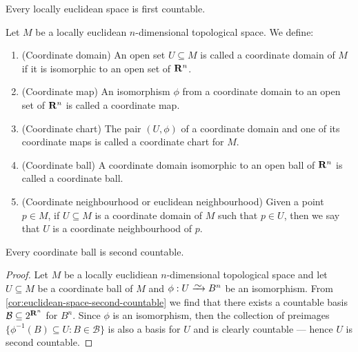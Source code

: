 \begin{proposition}
\label{prop:locally-euclidean-first-countable}
Every locally euclidean space is first countable.
\end{proposition}


\begin{definition}[Miscelaneous]
Let \(M\) be a locally euclidean \(n\)-dimensional topological space. We
define:
\begin{enumerate}[(C1)]
  \item\label{def: coordinate domain}
    (Coordinate domain) An open set \(U \subseteq M\) is called a coordinate
    domain of \(M\) if it is isomorphic to an open set of \(\mathbf{R}^n\).
  \item\label{def: coordinate map}
    (Coordinate map) An isomorphism \(\phi\) from a coordinate domain to an
    open set of \(\mathbf{R}^n\) is called a coordinate map.
  \item\label{def: coordinate chart}
    (Coordinate chart) The pair \((U, \phi)\) of a coordinate domain and one
    of its coordinate maps is called a coordinate chart for \(M\).
  \item\label{def: coordinate ball}
    (Coordinate ball) A coordinate domain isomorphic to an open ball of
    \(\mathbf{R}^n\) is called a coordinate ball.
  \item\label{def: euclidean neighbourhood}
    (Coordinate neighbourhood or euclidean neighbourhood) Given a point \(p
    \in M\), if \(U \subseteq M\) is a coordinate domain of \(M\) such that
    \(p \in U\), then we say that \(U\) is a coordinate neighbourhood of
    \(p\).
\end{enumerate}
\end{definition}

\begin{proposition}
\label{prop:coordinate-ball-second-countable}
Every coordinate ball is second countable.
\end{proposition}

\begin{proof}
Let \(M\) be a locally euclidiean \(n\)-dimensional topological space and let
\(U \subseteq M\) be a coordinate ball of \(M\) and \(\phi: U \isoto B^n\) be an
isomorphism. From \cref{cor:euclidean-space-second-countable} we find that there
exists a countable basis \(\mathcal B \subseteq 2^{\mathbf{R}^n}\) for \(B^n\). Since
\(\phi\) is an isomorphism, then the collection of preimages \(\{\phi^{-1}(B)
\subseteq U : B \in \mathcal B\}\) is also a basis for \(U\) and is clearly
countable --- hence \(U\) is second countable.
\end{proof}

